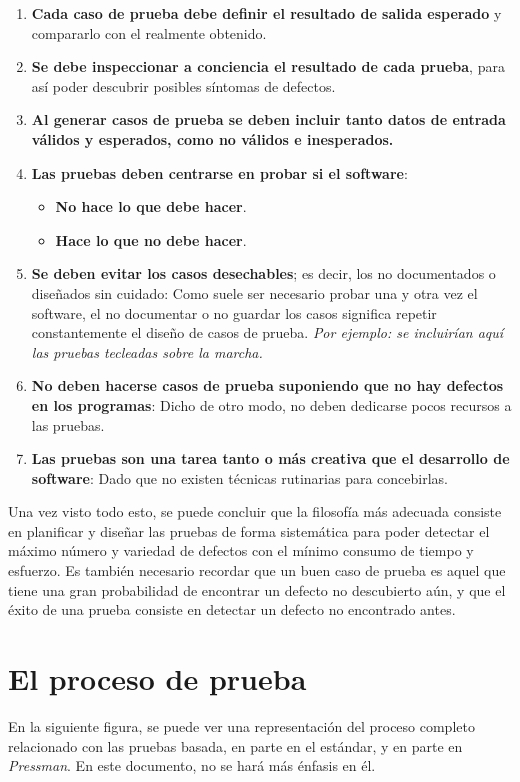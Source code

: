 \begin{enumerate}
    \item \textbf{Cada caso de prueba debe definir el resultado de salida esperado} y compararlo con el realmente obtenido.
    \item \textbf{Se debe inspeccionar a conciencia el resultado de cada prueba}, para así poder descubrir posibles síntomas de defectos.
    \item \textbf{Al generar casos de prueba se deben incluir tanto datos de entrada válidos y esperados, como no válidos e inesperados.}
    \item \textbf{Las pruebas deben centrarse en probar si el software}:
          \begin{itemize}
              \item \textbf{No hace lo que debe hacer}.
              \item \textbf{Hace lo que no debe hacer}.
          \end{itemize}
    \item \textbf{Se deben evitar los casos desechables}; es decir, los no documentados o diseñados sin cuidado: Como suele ser necesario probar una y otra vez el software, el no documentar o no guardar los casos significa repetir constantemente el diseño de casos de prueba. \textit{Por ejemplo: se incluirían aquí las pruebas tecleadas sobre la marcha.}
    \item \textbf{No deben hacerse casos de prueba suponiendo que no hay defectos en los programas}: Dicho de otro modo, no deben dedicarse pocos recursos a las pruebas.
    \item \textbf{Las pruebas son una tarea tanto o más creativa que el desarrollo de software}: Dado que no existen técnicas rutinarias para concebirlas.
\end{enumerate}

Una vez visto todo esto, se puede concluir que la filosofía más adecuada consiste en planificar y diseñar las pruebas de forma sistemática para poder detectar el máximo número y variedad de defectos con el mínimo consumo de tiempo y esfuerzo. Es también necesario recordar que un buen caso de prueba es aquel que tiene una gran probabilidad de encontrar un defecto no descubierto aún, y que el éxito de una prueba consiste en detectar un defecto no encontrado antes.


\section{El proceso de prueba}

En la siguiente figura, se puede ver una representación del proceso completo relacionado con las pruebas basada, en parte en el estándar, y en parte en \textit{Pressman}. En este documento, no se hará más énfasis en él.

